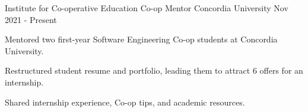 

\begin{cventries}

  \cventry
    {Institute for Co-operative Education} %
    {Co-op Mentor} %
    {Concordia University} %
    {Nov 2021 - Present} %
    {
      \begin{cvitems} %
        \item {Mentored two first-year Software Engineering Co-op students at Concordia University.}
        \item {Restructured student resume and portfolio, leading them to attract 6 offers for an internship.}
        \item {Shared internship experience, Co-op tips, and academic resources.}
      \end{cvitems}
    }


\end{cventries}
